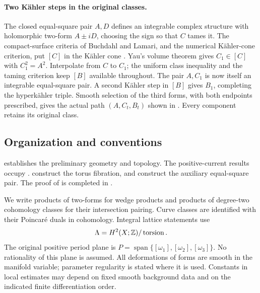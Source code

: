 \paragraph{Two K\"ahler steps in the original classes.}
The closed equal-square pair $A,D$ defines an integrable complex
structure with holomorphic two-form $A\pm iD$, choosing the sign
so that $C$ tames it. The compact-surface
criteria of Buchdahl and Lamari, and the numerical K\"ahler-cone
criterion, put $[C]$ in the K\"ahler cone
\cite{Buchdahl1999,Lamari1999,DemaillyPaun2004}.
Yau's volume theorem \cite{Yau1978} gives $C_1\in[C]$ with
$C_1^2=A^2$. Interpolate from $C$ to $C_1$; the uniform class
inequality and the taming criterion keep $[B]$ available throughout.
The pair $A,C_1$ is now itself an integrable equal-square pair.
A second K\"ahler step in $[B]$ gives $B_1$, completing the
hyperk\"ahler triple. Smooth selection of the third forms, with both
endpoints prescribed, gives the actual path $(A,C_t,B_t)$ shown in
. Every component retains its original class.

\subsection{Organization and conventions}

 establishes the preliminary geometry and
topology. The positive-current results occupy
.
 construct the
torus fibration, and
construct the auxiliary equal-square pair. The proof of
 is completed in .

We write products of two-forms for wedge products and products of
degree-two cohomology classes for their intersection pairing.
Curve classes are identified with their Poincar\'e duals in cohomology.
Integral lattice statements use
\[
 \Lambda=H^2(X;\mathbb Z)/\operatorname{torsion}.
\]
The original positive period plane is
$P=\operatorname{span}\{[\omega_1],[\omega_2],[\omega_3]\}$.
No rationality of this plane is assumed. All deformations of forms are
smooth in the manifold variable; parameter regularity is stated where
it is used. Constants in local estimates may depend on fixed smooth
background data and on the indicated finite differentiation order.

